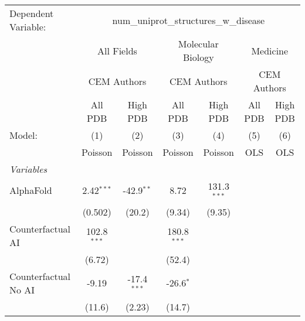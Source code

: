 \begingroup
\centering
\begin{tabular}{lcccccc}
   \tabularnewline \midrule \midrule
   Dependent Variable: & \multicolumn{6}{c}{num\_uniprot\_structures\_w\_disease}\\
 & \multicolumn{2}{c}{All Fields} & \multicolumn{2}{c}{Molecular Biology} & \multicolumn{2}{c}{Medicine} \\
\cmidrule(lr){2-3} \cmidrule(lr){4-5} \cmidrule(lr){6-7}
 & \multicolumn{2}{c}{CEM Authors} & \multicolumn{2}{c}{CEM Authors} & \multicolumn{2}{c}{CEM Authors} \\
\cmidrule(lr){2-3} \cmidrule(lr){4-5} \cmidrule(lr){6-7}
 & \multicolumn{1}{c}{All PDB} & \multicolumn{1}{c}{High PDB} & \multicolumn{1}{c}{All PDB} & \multicolumn{1}{c}{High PDB} & \multicolumn{1}{c}{All PDB} & \multicolumn{1}{c}{High PDB} \\
\cmidrule(lr){2-2} \cmidrule(lr){3-3} \cmidrule(lr){4-4} \cmidrule(lr){5-5} \cmidrule(lr){6-6} \cmidrule(lr){7-7}
   Model:                                                     & (1)              & (2)                   & (3)           & (4)            & (5)  & (6)\\  
                                                              &  Poisson         & Poisson               & Poisson       & Poisson        & OLS  & OLS\\  
   \midrule
   \emph{Variables}\\
   AlphaFold                                                  & 2.42$^{***}$     & -42.9$^{**}$          & 8.72          & 131.3$^{***}$  &      &   \\   
                                                              & (0.502)          & (20.2)                & (9.34)        & (9.35)         &      &   \\   
   Counterfactual AI                                          & 102.8$^{***}$    &                       & 180.8$^{***}$ &                &      &   \\   
                                                              & (6.72)           &                       & (52.4)        &                &      &   \\   
   Counterfactual No AI                                       & -9.19            & -17.4$^{***}$         & -26.6$^{*}$   &                &      &   \\   
                                                              & (11.6)           & (2.23)                & (14.7)        &                &      &   \\   

\end{tabular}
